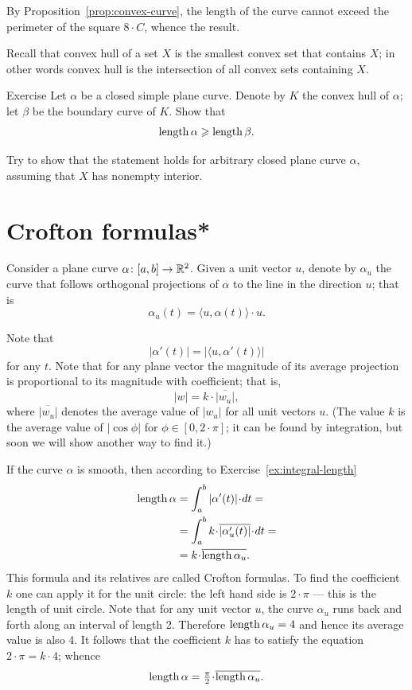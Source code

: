 By Proposition~\ref{prop:convex-curve}, the length of the curve cannot exceed the perimeter of the square $8\cdot C$, whence the result.
\qeds

Recall that convex hull of a set $X$ is the smallest convex set that contains $X$; in other words convex hull is the intersection of all convex sets containing $X$.

\begin{thm}{Exercise}\label{ex:convex-hull}
Let $\alpha$ be a closed simple plane curve.
Denote by $K$ the convex hull of $\alpha$; let $\beta$ be the boundary curve of $K$.
Show that 
\[\mathop{\rm length}\nolimits \alpha\geqslant \mathop{\rm length}\nolimits \beta.\]

Try to show that the statement holds for arbitrary closed plane curve $\alpha$, assuming that $X$ has nonempty interior.
\end{thm}


\section*{Crofton formulas*}

Consider a plane curve $\alpha\colon[a,b]\to\mathbb{R}^2$.
Given a unit vector $u$, denote by $\alpha_u$ the curve that follows orthogonal projections of $\alpha$ to the line in the direction $u$;
that is 
\[\alpha_u(t)=\langle u,\alpha(t)\rangle\cdot u.\]

Note that 
\[|\alpha'(t)|=|\langle u,\alpha'(t)\rangle|\] for any $t$.
Note that for any plane vector the magnitude of its average projection is proportional to its magnitude with coefficient; that is,
\[|w|=k\cdot \overline{|w_u|},\]
where $\overline{|w_u|}$ denotes the average value of $|w_u|$ for all unit vectors $u$.
(The value $k$ is the average value of $|\cos\phi|$ for $\phi\in [0,2\cdot\pi]$; it can be found by integration, but soon we will show another way to find it.)

If the curve $\alpha$ is smooth, then according to Exercise~\ref{ex:integral-length}
\begin{align*}
\length\alpha
&=\int_a^b|\alpha'(t)|\cdot dt=
\\
&=\int_a^b  k\cdot \overline{|\alpha_u'(t)|}\cdot dt=
\\
&=k\cdot \overline{\length\alpha_u}.
\end{align*}
This formula and its relatives are called Crofton formulas.
To find the coefficient $k$ one can apply it for the unit circle: the left hand side is $2\cdot\pi$ --- this is the length of unit circle.
Note that for any unit vector $u$, the curve $\alpha_u$ runs back and forth along an interval of length 2.
Therefore $\mathop{\rm length}\nolimits\alpha_u=4$ and hence its average value is also 4.
It follows that the coefficient $k$ has to satisfy the equation $2\cdot \pi =k\cdot 4$; whence 
\[
\length\alpha
=\tfrac\pi2\cdot \overline{\length\alpha_u}.
\]

